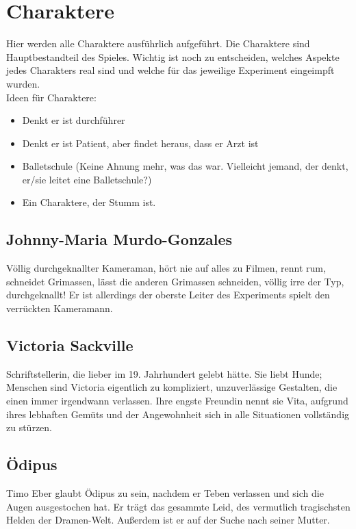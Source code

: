 \documentclass[12pt, a4paper, openany]{report}
\begin{document}
\chapter{Charaktere}
Hier werden alle Charaktere ausführlich aufgeführt. Die Charaktere sind Hauptbestandteil des Spieles. Wichtig ist noch zu entscheiden, welches Aspekte jedes Charakters \glqq real\grqq{} sind und welche für das jeweilige Experiment \glqq eingeimpft\grqq{} wurden.\\
Ideen für Charaktere:
\begin{itemize}
\item Denkt er ist durchführer
\item Denkt er ist Patient, aber findet heraus, dass er Arzt ist
\item Balletschule (Keine Ahnung mehr, was das war. Vielleicht jemand, der denkt, er/sie leitet eine Balletschule?)
\item Ein Charaktere, der Stumm ist.
\end{itemize}

\section{Johnny-Maria Murdo-Gonzales}
Völlig durchgeknallter Kameraman, hört nie auf alles zu Filmen, rennt rum, schneidet Grimassen, lässt die anderen Grimassen schneiden, völlig irre der Typ, durchgeknallt! 
Er ist allerdings der oberste Leiter des Experiments \glqq spielt\grqq{} den verrückten Kameramann. 

\section{Victoria Sackville}
Schriftstellerin, die lieber im 19. Jahrhundert gelebt hätte. Sie liebt Hunde; Menschen sind Victoria eigentlich zu kompliziert, unzuverlässige Gestalten, die einen immer irgendwann verlassen. Ihre engste Freundin nennt sie Vita, aufgrund ihres lebhaften Gemüts und der Angewohnheit sich in alle Situationen vollständig zu stürzen.

\section{Ödipus}
Timo Eber glaubt Ödipus zu sein, nachdem er Teben verlassen und sich die Augen ausgestochen hat.
Er trägt das gesammte Leid, des vermutlich tragischsten Helden der Dramen-Welt.
Außerdem ist er auf der Suche nach seiner Mutter.
\end{document}
